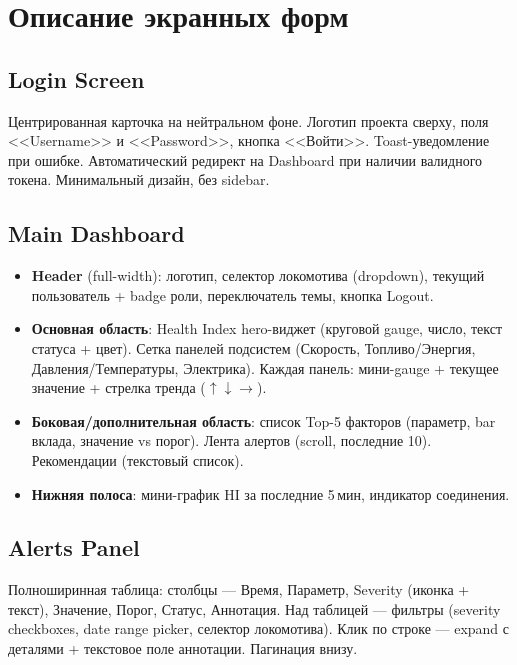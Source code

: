 \documentclass[12pt,a4paper]{article}
\begin{document}
\section{Описание экранных форм}

\subsection{Login Screen}

Центрированная карточка на нейтральном фоне. Логотип проекта сверху, поля <<Username>> и <<Password>>, кнопка <<Войти>>. Toast-уведомление при ошибке. Автоматический редирект на Dashboard при наличии валидного токена. Минимальный дизайн, без sidebar.

\subsection{Main Dashboard}

\begin{itemize}[nosep]
  \item \textbf{Header} (full-width): логотип, селектор локомотива (dropdown), текущий пользователь + badge роли, переключатель темы, кнопка Logout.
  \item \textbf{Основная область}: Health Index hero-виджет (круговой gauge, число, текст статуса + цвет). Сетка панелей подсистем (Скорость, Топливо/Энергия, Давления/Температуры, Электрика). Каждая панель: мини-gauge + текущее значение + стрелка тренда ($\uparrow\downarrow\rightarrow$).
  \item \textbf{Боковая/дополнительная область}: список Top-5 факторов (параметр, bar вклада, значение vs порог). Лента алертов (scroll, последние 10). Рекомендации (текстовый список).
  \item \textbf{Нижняя полоса}: мини-график HI за последние 5\,мин, индикатор соединения.
\end{itemize}

\subsection{Alerts Panel}

Полноширинная таблица: столбцы --- Время, Параметр, Severity (иконка + текст), Значение, Порог, Статус, Аннотация. Над таблицей --- фильтры (severity checkboxes, date range picker, селектор локомотива). Клик по строке --- expand с деталями + текстовое поле аннотации. Пагинация внизу.
\end{document}
